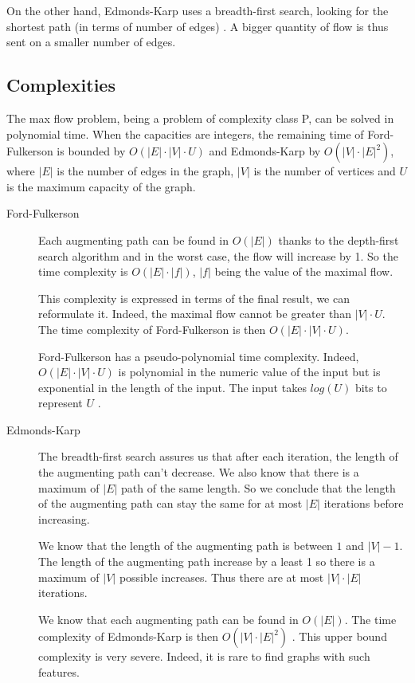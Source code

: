 On the other hand, Edmonds-Karp uses a breadth-first search, looking for the shortest path (in terms of number of edges) \cite{lectu7}. A bigger quantity of flow is thus sent on a smaller number of edges. \newline


\subsection{Complexities}
The max flow problem, being a problem of complexity class P, can be solved in polynomial time. When the capacities are integers, the remaining time of Ford-Fulkerson is bounded by $O(|E|\cdot |V|\cdot U)$ and Edmonds-Karp by $O(|V|\cdot |E|^2)$, where $|E|$ is the number of edges in the graph, $|V|$ is the number of vertices and $U$ is the maximum capacity of the graph.

\begin{description}
\item[Ford-Fulkerson]{Each augmenting path can be found in $O(|E|)$ thanks to the depth-first search algorithm and in the worst case, the flow will increase by 1. So the time complexity is $O(|E|\cdot |f|)$, $|f|$ being the value of the maximal flow. 

This complexity is expressed in terms of the final result, we can reformulate it. Indeed, the maximal flow cannot be greater than $|V|\cdot U$. The time complexity of Ford-Fulkerson is then $O(|E|\cdot |V|\cdot U)$.

Ford-Fulkerson has a pseudo-polynomial time complexity. Indeed, $O(|E|\cdot |V|\cdot U)$ is polynomial in the numeric value of the input but is exponential in the length of the input. The input takes $log(U)$ bits to represent $U$ \cite{lectu5}.}

\item[Edmonds-Karp]{The breadth-first search assures us that after each iteration, the length of the augmenting path can't decrease. We also know that there is a maximum of $|E|$ path of the same length. So we conclude that the length of the augmenting path can stay the same for at most $|E|$ iterations before increasing. 

We know that the length of the augmenting path is between $1$ and $|V|-1$. The length of the augmenting path increase by a least 1 so there is a maximum of $|V|$ possible increases. Thus there are at most $|V|\cdot |E|$ iterations.

We know that each augmenting path can be found in $O(|E|)$. The time complexity of Edmonds-Karp is then $O(|V|\cdot |E|^2)$ \cite{lectu7}. This upper bound complexity is very severe. Indeed, it is rare to find graphs with such features.}
\end{description}



